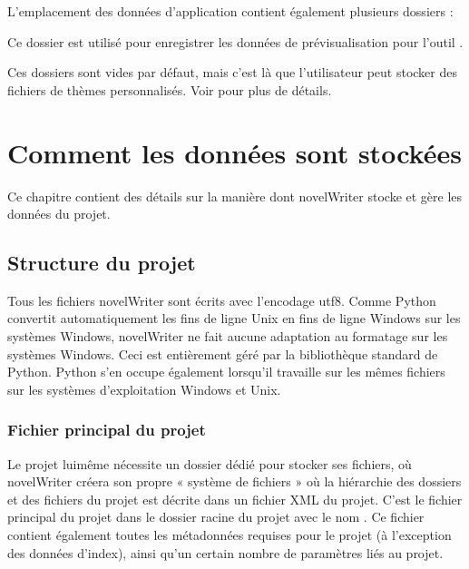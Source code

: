 \documentclass[a4paper,11pt,french]{sphinxmanual}
\begin{document}
\sphinxAtStartPar
L’emplacement des données d’application contient également plusieurs dossiers :
\begin{description}
\sphinxAtStartPar
Ce dossier est utilisé pour enregistrer les données de prévisualisation pour l’outil .

\sphinxAtStartPar
Ces dossiers sont vides par défaut, mais c’est là que l’utilisateur peut stocker des fichiers de thèmes personnalisés. Voir {\hyperref[\detokenize{more_customise:a-custom}]{}} pour plus de détails.

\end{description}

\sphinxstepscope


\chapter{Comment les données sont stockées}
\label{\detokenize{tech_storage:how-data-is-stored}}\label{\detokenize{tech_storage:a-storage}}\label{\detokenize{tech_storage::doc}}
\sphinxAtStartPar
Ce chapitre contient des détails sur la manière dont novelWriter stocke et gère les données du projet.


\section{Structure du projet}
\label{\detokenize{tech_storage:project-structure}}
\sphinxAtStartPar
Tous les fichiers novelWriter sont écrits avec l’encodage utf\sphinxhyphen{}8. Comme Python convertit automatiquement les fins de ligne Unix en fins de ligne Windows sur les systèmes Windows, novelWriter ne fait aucune adaptation au formatage sur les systèmes Windows. Ceci est entièrement géré par la bibliothèque standard de Python. Python s’en occupe également lorsqu’il travaille sur les mêmes fichiers sur les systèmes d’exploitation Windows et Unix.


\subsection{Fichier principal du projet}
\label{\detokenize{tech_storage:main-project-file}}
\sphinxAtStartPar
Le projet lui\sphinxhyphen{}même nécessite un dossier dédié pour stocker ses fichiers, où novelWriter créera son propre « système de fichiers » où la hiérarchie des dossiers et des fichiers du projet est décrite dans un fichier XML du projet. C’est le fichier principal du projet dans le dossier racine du projet avec le nom . Ce fichier contient également toutes les métadonnées requises pour le projet (à l’exception des données d’index), ainsi qu’un certain nombre de paramètres liés au projet.
\end{document}
